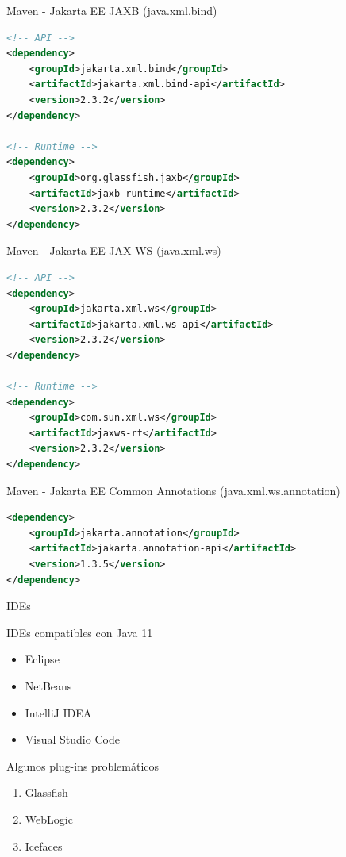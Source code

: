 \documentclass[aspectratio=169]{beamer}
\begin{document}
\begin{frame}[fragile]{Maven - Jakarta EE}
JAXB (java.xml.bind)

\begin{lstlisting}[language=xml]
<!-- API -->
<dependency>
    <groupId>jakarta.xml.bind</groupId>
    <artifactId>jakarta.xml.bind-api</artifactId>
    <version>2.3.2</version>
</dependency>

<!-- Runtime -->
<dependency>
    <groupId>org.glassfish.jaxb</groupId>
    <artifactId>jaxb-runtime</artifactId>
    <version>2.3.2</version>
</dependency>
\end{lstlisting}
\end{frame}

\begin{frame}[fragile]{Maven - Jakarta EE}
    JAX-WS (java.xml.ws)

\begin{lstlisting}[language=xml]
<!-- API -->
<dependency>
    <groupId>jakarta.xml.ws</groupId>
    <artifactId>jakarta.xml.ws-api</artifactId>
    <version>2.3.2</version>
</dependency>

<!-- Runtime -->
<dependency>
    <groupId>com.sun.xml.ws</groupId>
    <artifactId>jaxws-rt</artifactId>
    <version>2.3.2</version>
</dependency>
\end{lstlisting}
\end{frame}

\begin{frame}[fragile]{Maven - Jakarta EE}
Common Annotations (java.xml.ws.annotation)

\begin{lstlisting}[language=xml]
<dependency>
    <groupId>jakarta.annotation</groupId>
    <artifactId>jakarta.annotation-api</artifactId>
    <version>1.3.5</version>
</dependency>
\end{lstlisting}
\end{frame}

\begin{frame}[fragile]{IDEs}

    IDEs compatibles con Java 11
    \begin{itemize}
        \item Eclipse
        \item NetBeans
        \item IntelliJ IDEA
        \item Visual Studio Code
    \end{itemize}

    Algunos plug-ins problemáticos
    \begin{enumerate}
        \item Glassfish
        \item WebLogic
        \item Icefaces
    \end{enumerate}
\end{frame}
\end{document}

